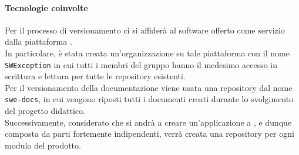 \paragraph{Tecnologie coinvolte}
Per il processo di versionamento ci si affiderà al software  offerto come servizio dalla piattaforma .\\
In particolare, è stata creata un'organizzazione su tale piattaforma con il nome \verb|SWException| in cui tutti i membri del gruppo
hanno il medesimo accesso in scrittura e lettura per tutte le repository esistenti.\\
Per il versionamento della documentazione viene usata una repository dal nome \verb|swe-docs|, in cui vengono riposti tutti i
documenti creati durante lo svolgimento del progetto didattico.\\
Successivamente,  considerato che si andrà a creare un'applicazione a , e dunque composta da parti fortemente indipendenti,
verrà creata una repository per ogni modulo del prodotto.

